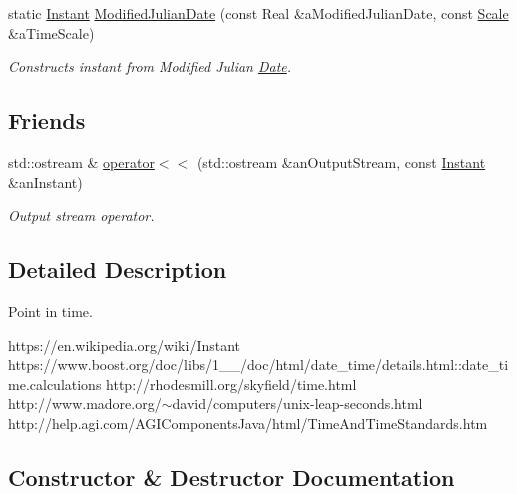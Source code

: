 \begin{DoxyCompactItemize}
static \hyperlink{classostk_1_1physics_1_1time_1_1_instant}{Instant} \hyperlink{classostk_1_1physics_1_1time_1_1_instant_af515c6d0547e40a337efb865a71c2558}{Modified\+Julian\+Date} (const Real \&a\+Modified\+Julian\+Date, const \hyperlink{namespaceostk_1_1physics_1_1time_adf23d37bd8641fb76a0e98ab46a70df7}{Scale} \&a\+Time\+Scale)
\begin{DoxyCompactList}\small\item\em Constructs instant from Modified Julian \hyperlink{classostk_1_1physics_1_1time_1_1_date}{Date}. \end{DoxyCompactList}\end{DoxyCompactItemize}
\subsection*{Friends}
\begin{DoxyCompactItemize}
\item 
std\+::ostream \& \hyperlink{classostk_1_1physics_1_1time_1_1_instant_a01668796f6ebfd8c23c2d0df17f00b65}{operator$<$$<$} (std\+::ostream \&an\+Output\+Stream, const \hyperlink{classostk_1_1physics_1_1time_1_1_instant}{Instant} \&an\+Instant)
\begin{DoxyCompactList}\small\item\em Output stream operator. \end{DoxyCompactList}\end{DoxyCompactItemize}


\subsection{Detailed Description}
Point in time. 

https\+://en.wikipedia.\+org/wiki/\+Instant https\+://www.boost.\+org/doc/libs/1\+\_\+\_/doc/html/date\+\_\+time/details.html\+::date\+\_\+time.\+calculations http\+://rhodesmill.org/skyfield/time.\+html http\+://www.madore.\+org/$\sim$david/computers/unix-\/leap-\/seconds.html http\+://help.agi.\+com/\+A\+G\+I\+Components\+Java/html/\+Time\+And\+Time\+Standards.htm 

\subsection{Constructor \& Destructor Documentation}
\mbox{\label{classostk_1_1physics_1_1time_1_1_instant_a132c1e4b2fe9a9a671109206e297bd5d}} 
